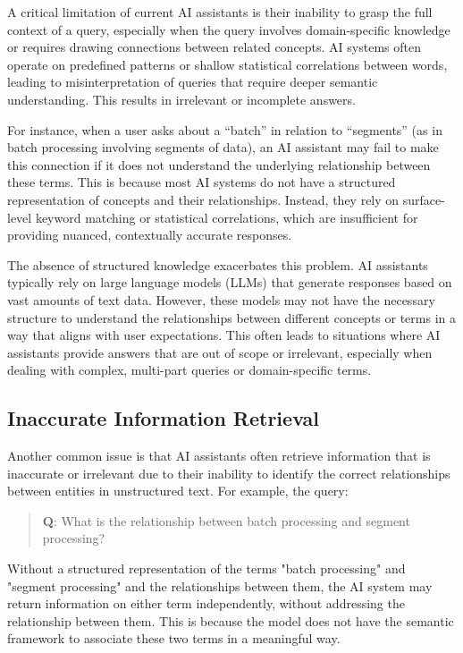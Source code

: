 A critical limitation of current AI assistants is their inability to grasp the full context of a query, especially when the query involves domain-specific knowledge or requires drawing connections between related concepts. AI systems often operate on predefined patterns or shallow statistical correlations between words, leading to misinterpretation of queries that require deeper semantic understanding. This results in irrelevant or incomplete answers.

For instance, when a user asks about a “batch” in relation to “segments” (as in batch processing involving segments of data), an AI assistant may fail to make this connection if it does not understand the underlying relationship between these terms. This is because most AI systems do not have a structured representation of concepts and their relationships. Instead, they rely on surface-level keyword matching or statistical correlations, which are insufficient for providing nuanced, contextually accurate responses.

The absence of structured knowledge exacerbates this problem. AI assistants typically rely on large language models (LLMs) that generate responses based on vast amounts of text data. However, these models may not have the necessary structure to understand the relationships between different concepts or terms in a way that aligns with user expectations. This often leads to situations where AI assistants provide answers that are out of scope or irrelevant, especially when dealing with complex, multi-part queries or domain-specific terms.

\subsection{Inaccurate Information Retrieval}

Another common issue is that AI assistants often retrieve information that is inaccurate or irrelevant due to their inability to identify the correct relationships between entities in unstructured text. For example, the query:
\begin{quote}
    \textbf{Q}: What is the relationship between batch processing and segment processing?
\end{quote}
Without a structured representation of the terms "batch processing" and "segment processing" and the relationships between them, the AI system may return information on either term independently, without addressing the relationship between them. This is because the model does not have the semantic framework to associate these two terms in a meaningful way.

